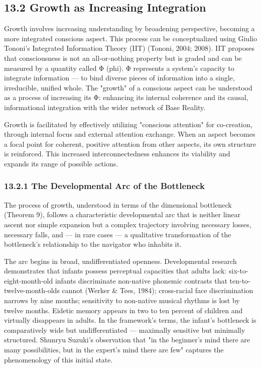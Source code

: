\subsection*{13.2 Growth as Increasing Integration}


Growth involves increasing understanding by broadening perspective, becoming a more integrated conscious aspect. This process can be conceptualized using Giulio Tononi's Integrated Information Theory (IIT) (Tononi, 2004; 2008). IIT proposes that consciousness is not an all-or-nothing property but is graded and can be measured by a quantity called Φ (phi). Φ represents a system's capacity to integrate information — to bind diverse pieces of information into a single, irreducible, unified whole. The "growth" of a conscious aspect can be understood as a process of increasing its Φ: enhancing its internal coherence and its causal, informational integration with the wider network of Base Reality.


Growth is facilitated by effectively utilizing "conscious attention" for co-creation, through internal focus and external attention exchange. When an aspect becomes a focal point for coherent, positive attention from other aspects, its own structure is reinforced. This increased interconnectedness enhances its viability and expands its range of possible actions.


\subsubsection*{13.2.1 The Developmental Arc of the Bottleneck}


The process of growth, understood in terms of the dimensional bottleneck (Theorem 9), follows a characteristic developmental arc that is neither linear ascent nor simple expansion but a complex trajectory involving necessary losses, necessary falls, and — in rare cases — a qualitative transformation of the bottleneck's relationship to the navigator who inhabits it.


The arc begins in broad, undifferentiated openness. Developmental research demonstrates that infants possess perceptual capacities that adults lack: six-to-eight-month-old infants discriminate non-native phonemic contrasts that ten-to-twelve-month-olds cannot (Werker \& Tees, 1984); cross-racial face discrimination narrows by nine months; sensitivity to non-native musical rhythms is lost by twelve months. Eidetic memory appears in two to ten percent of children and virtually disappears in adults. In the framework's terms, the infant's bottleneck is comparatively wide but undifferentiated — maximally sensitive but minimally structured. Shunryu Suzuki's observation that "in the beginner's mind there are many possibilities, but in the expert's mind there are few" captures the phenomenology of this initial state.


